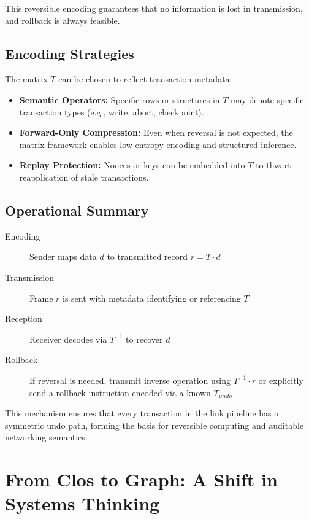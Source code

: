 This reversible encoding guarantees that no information is lost in transmission, and rollback is always feasible.

\subsection{Encoding Strategies}

The matrix $T$ can be chosen to reflect transaction metadata:
\begin{itemize}
  \item \textbf{Semantic Operators:} Specific rows or structures in $T$ may denote specific transaction types (e.g., write, abort, checkpoint).
  \item \textbf{Forward-Only Compression:} Even when reversal is not expected, the matrix framework enables low-entropy encoding and structured inference.
  \item \textbf{Replay Protection:} Nonces or keys can be embedded into $T$ to thwart reapplication of stale transactions.
\end{itemize}

\subsection{Operational Summary}

\begin{description}
  \item[Encoding] Sender maps data $d$ to transmitted record $r = T \cdot d$
  \item[Transmission] Frame $r$ is sent with metadata identifying or referencing $T$
  \item[Reception] Receiver decodes via $T^{-1}$ to recover $d$
  \item[Rollback] If reversal is needed, transmit inverse operation using $T^{-1} \cdot r$ or explicitly send a rollback instruction encoded via a known $T_{undo}$
\end{description}

This mechanism ensures that every transaction in the link pipeline has a symmetric undo path, forming the basis for reversible computing and auditable networking semantics.




\section{From Clos to Graph: A Shift in Systems Thinking}

